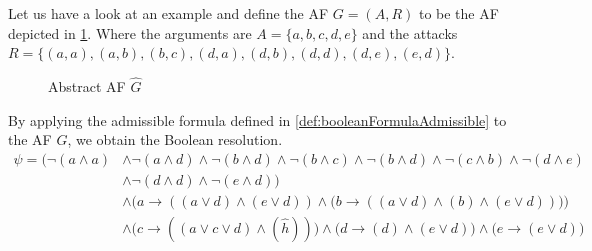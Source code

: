 \begin{example}
    Let us have a look at an example and define the AF $G=(A,R)$ to be the AF depicted in \cref{af:algorithmEncodingsAdmissible}. Where the arguments are $A=\{a, b, c, d, e\}$ and the attacks $R=\big\{ (a,a), (a,b), (b,c), (d,a), (d,b), (d,d), (d, e), (e, d)\big\}$.

    \begin{figure}[H]
        \centering
        \caption{Abstract AF $\hat{G}$}
        \label{af:algorithmEncodingsAdmissible}
    \end{figure}

By applying the admissible formula defined in \cref{def:booleanFormulaAdmissible} to the AF $G$, we obtain the Boolean resolution.
\begin{align*}
    \psi = \big(
    \lnot (a \land a)
    & \land \lnot (a \land d) \land \lnot (b \land d) \land \lnot (b \land c) \land \lnot (b \land d) \land \lnot (c \land b) \land \lnot (d \land e) \\
    & \land \lnot (d \land d) \land \lnot (e \land d) \big) \\
    & \land \bigl( a \rightarrow ((a \lor d) \land (e \lor d)) \land \bigl( b \rightarrow ((a \lor d) \land (b) \land (e \lor d)) \bigl) \bigl)\\
    & \land \bigl( c \rightarrow ((a \lor c \lor d) \land (\hat{h})) \bigl) \land \bigl( d \rightarrow (d) \land (e \lor d) \bigl) \land \bigl( e \rightarrow (e \lor d) \bigl)
\end{align*}


\end{example}
